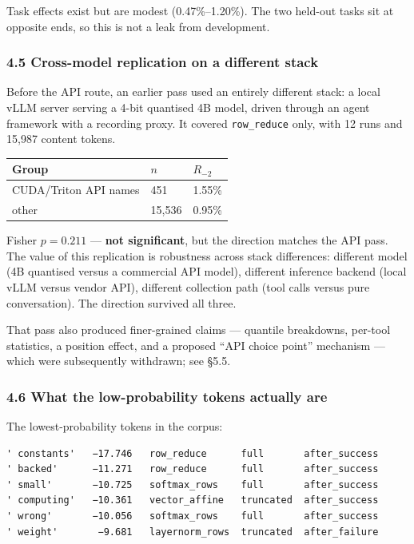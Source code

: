 \documentclass[
  11pt,
]{article}
\begin{document}
Task effects exist but are modest (0.47\%--1.20\%). The two held-out
tasks sit at opposite ends, so this is not a leak from development.

\hypertarget{cross-model-replication-on-a-different-stack}{%
\subsubsection{4.5 Cross-model replication on a different
stack}\label{cross-model-replication-on-a-different-stack}}

Before the API route, an earlier pass used an entirely different stack:
a local vLLM server serving a 4-bit quantised 4B model, driven through
an agent framework with a recording proxy. It covered
\texttt{row\_reduce} only, with 12 runs and 15,987 content tokens.

\begin{longtable}[]{@{}lll@{}}
\toprule
Group & \(n\) & \(R_{-2}\) \\
\midrule
\endhead
CUDA/Triton API names & 451 & 1.55\% \\
other & 15,536 & 0.95\% \\
\bottomrule
\end{longtable}

Fisher \(p = 0.211\) --- \textbf{not significant}, but the direction
matches the API pass. The value of this replication is robustness across
stack differences: different model (4B quantised versus a commercial API
model), different inference backend (local vLLM versus vendor API),
different collection path (tool calls versus pure conversation). The
direction survived all three.

That pass also produced finer-grained claims --- quantile breakdowns,
per-tool statistics, a position effect, and a proposed ``API choice
point'' mechanism --- which were subsequently withdrawn; see §5.5.

\hypertarget{what-the-low-probability-tokens-actually-are}{%
\subsubsection{4.6 What the low-probability tokens actually
are}\label{what-the-low-probability-tokens-actually-are}}

The lowest-probability tokens in the corpus:

\begin{verbatim}
' constants'   −17.746   row_reduce      full       after_success
' backed'      −11.271   row_reduce      full       after_success
' small'       −10.725   softmax_rows    full       after_success
' computing'   −10.361   vector_affine   truncated  after_success
' wrong'       −10.056   softmax_rows    full       after_success
' weight'       −9.681   layernorm_rows  truncated  after_failure
\end{verbatim}
\end{document}
